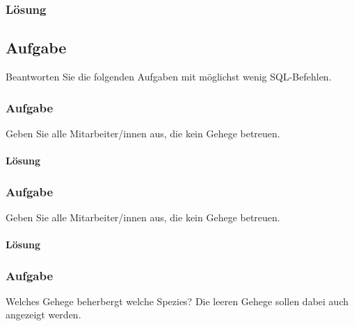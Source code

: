 \subsubsection*{Lösung}
\label{sec:uebung_01.aufgabe_9.loesung}


\subsection{Aufgabe}
\label{sec:uebung_01.aufgabe_10}
Beantworten Sie die folgenden Aufgaben mit möglichst wenig SQL-Befehlen.

\subsubsection{Aufgabe}
\label{sec:uebung_01.aufgabe_10a}
Geben Sie alle Mitarbeiter/innen aus, die kein Gehege betreuen.

\paragraph*{Lösung}
\label{sec:uebung_01.aufgabe_10a.loesung}

\subsubsection{Aufgabe}
\label{sec:uebung_01.aufgabe_10b}
Geben Sie alle Mitarbeiter/innen aus, die kein Gehege betreuen.

\paragraph*{Lösung}
\label{sec:uebung_01.aufgabe_10b.loesung}

\subsubsection{Aufgabe}
\label{sec:uebung_01.aufgabe_10c}
Welches Gehege beherbergt welche Spezies? Die leeren Gehege sollen dabei auch angezeigt werden.

